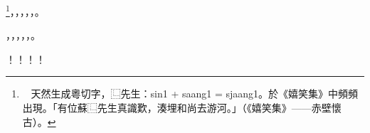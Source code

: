

\begin{dialogue}
    \footnote{：󲨾，天然生成粵切字，⿺先生：sin1 + saang1 = sjaang1。於《嬉笑集》中頻頻出現。「有位蘇⿺先生真識歎，湊埋和尚去游河。」（《嬉笑集》——赤壁懷古）。
    }，，，，，。
\end{dialogue}


\begin{dialogue}
，，，，，。
\end{dialogue}


\begin{dialogue}
    ！！！！
\end{dialogue}



